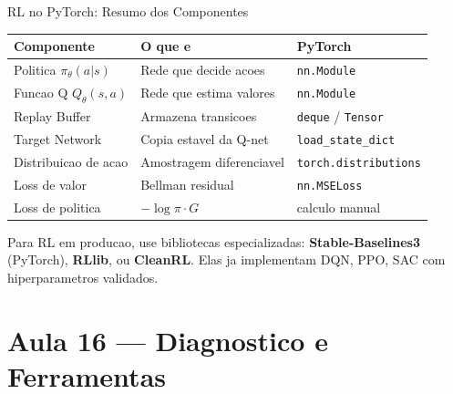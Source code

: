 \documentclass[aspectratio=169, 10pt]{beamer}
\begin{document}
\begin{frame}{RL no PyTorch: Resumo dos Componentes}
\centering
\begin{tabular}{lll}
\toprule
\textbf{Componente} & \textbf{O que e} & \textbf{PyTorch} \\
\midrule
Politica $\pi_\theta(a|s)$ & Rede que decide acoes & \texttt{nn.Module} \\
Funcao Q $Q_\theta(s,a)$ & Rede que estima valores & \texttt{nn.Module} \\
Replay Buffer & Armazena transicoes & \texttt{deque} / \texttt{Tensor} \\
Target Network & Copia estavel da Q-net & \texttt{load\_state\_dict} \\
Distribuicao de acao & Amostragem diferenciavel & \texttt{torch.distributions} \\
Loss de valor & Bellman residual & \texttt{nn.MSELoss} \\
Loss de politica & $-\log\pi \cdot G$ & calculo manual \\
\bottomrule
\end{tabular}
\vspace{0.6em}
\begin{destaque}
  Para RL em producao, use bibliotecas especializadas: 
  \textbf{Stable-Baselines3} (PyTorch), \textbf{RLlib}, ou \textbf{CleanRL}.
  Elas ja implementam DQN, PPO, SAC com hiperparametros validados.
\end{destaque}
\end{frame}

\section{Aula 16 — Diagnostico e Ferramentas}
\end{document}
